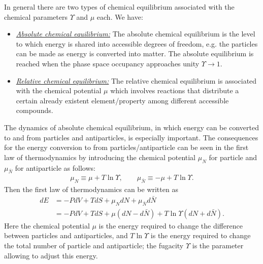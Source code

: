 In general there are two types of chemical equilibrium associated with the chemical parameters $\Upsilon$ and $\mu$ each. We have:
\begin{itemize}
\item \underline{\it Absolute chemical equilibrium:\/} 
The absolute chemical equilibrium is the level to which energy is shared into accessible degrees of freedom, e.g. the particles can be made as energy is converted into matter.
The absolute equilibrium is reached when the phase space occupancy approaches unity $\Upsilon\to1$. 
 \item \underline{\it Relative chemical equilibrium:\/}
 The relative chemical equilibrium is associated with the chemical potential $\mu$ which involves reactions that distribute a certain already existent element/property among different accessible compounds. 
 \end{itemize}
The dynamics of absolute chemical equilibrium, in which energy can be converted to and from particles and antiparticles, is especially important. The consequences for the energy conversion to from particles/antiparticle can be seen in the first law of thermodynamics by introducing the chemical potential $\mu_N$ for particle and $\mu_{\bar{N}}$ for antiparticle as follows:
\begin{align}
\mu_N\equiv\mu+T\ln\Upsilon,\qquad{\mu_{\bar{N}}}\equiv{-\mu}+T\ln\Upsilon.
\end{align}
Then the first law of thermodynamics can be written as
\begin{align}
dE&=-PdV+TdS+{\mu_N}dN+{\mu_{\bar{N}}}d{\bar{N}}
\\&=-PdV+TdS+{\mu}(dN-d{\bar{N}})+T\ln{\Upsilon}(dN+d{\bar{N}}).
\end{align}
Here the chemical potential $\mu$ is the energy required to change the difference between particles and antiparticles, and $T\ln\Upsilon$ is the energy required to change the total number of particle and antiparticle; the fugacity $\Upsilon$ is the parameter allowing to adjust this energy.

